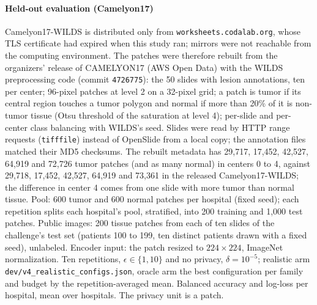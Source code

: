 \documentclass[acmsmall,screen,nonacm]{acmart}
\theoremstyle{acmdefinition}
\begin{document}
\paragraph{Held-out evaluation (Camelyon17)} Camelyon17-WILDS \cite{koh2021wilds} is distributed only from \texttt{worksheets.codalab.org}, whose TLS certificate had expired when this study ran; mirrors were not reachable from the computing environment. The patches were therefore rebuilt from the organizers' release of CAMELYON17 \cite{bandi2019camelyon17} (AWS Open Data) with the WILDS preprocessing code (commit \texttt{4726775}): the 50 slides with lesion annotations, ten per center; 96-pixel patches at level 2 on a 32-pixel grid; a patch is tumor if its central region touches a tumor polygon and normal if more than 20\% of it is non-tumor tissue (Otsu threshold of the saturation at level 4); per-slide and per-center class balancing with WILDS's seed. Slides were read by HTTP range requests (\texttt{tifffile}) instead of OpenSlide from a local copy; the annotation files matched their MD5 checksums. The rebuilt metadata has 29,717, 17,452, 42,527, 64,919 and 72,726 tumor patches (and as many normal) in centers 0 to 4, against 29,718, 17,452, 42,527, 64,919 and 73,361 in the released Camelyon17-WILDS; the difference in center 4 comes from one slide with more tumor than normal tissue. Pool: 600 tumor and 600 normal patches per hospital (fixed seed); each repetition splits each hospital's pool, stratified, into 200 training and 1,000 test patches. Public images: 200 tissue patches from each of ten slides of the challenge's test set (patients 100 to 199, ten distinct patients drawn with a fixed seed), unlabeled. Encoder input: the patch resized to $224\times224$, ImageNet normalization. Ten repetitions, $\epsilon\in\{1,10\}$ and no privacy, $\delta=10^{-5}$; realistic arm \texttt{dev/v4\_realistic\_configs.json}, oracle arm the best configuration per family and budget by the repetition-averaged mean. Balanced accuracy and log-loss per hospital, mean over hospitals. The privacy unit is a patch.

\begin{table}[ht]
\centering
\caption{Camelyon17 (held-out evaluation): balanced accuracy (higher is better) and log-loss of the logit-adjusted probabilities (lower is better), mean over five hospitals and \SimCamReps{} repetitions. Bold: the best per column among methods that use other hospitals, oracle excluded. $\dagger$: not private. $\star$: best of the six methods on the test patches. pFedMe's \cite{tdinh2020personalized} correctly calibrated noise makes it diverge at $\epsilon\in\{1,10\}$.}
\label{tab:camelyon}
\end{table}
\end{document}
